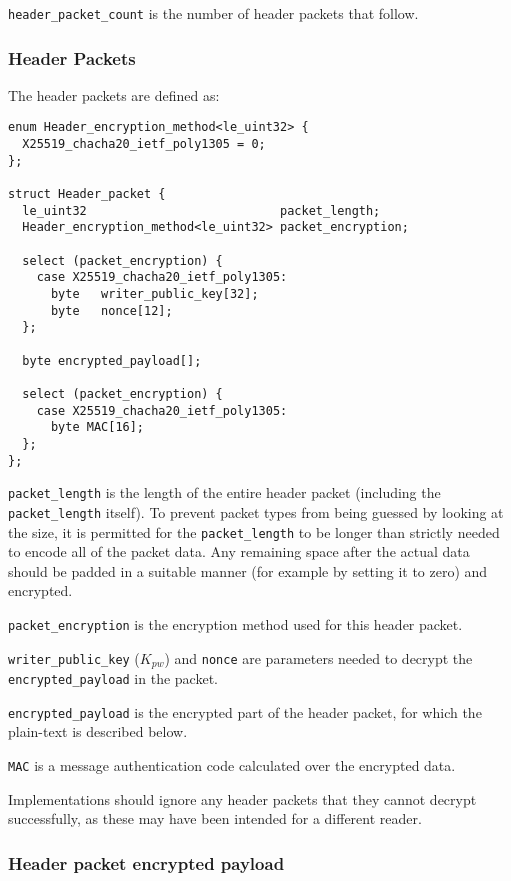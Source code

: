 \documentclass[10pt]{article}
\newcommand{\kw}[1]{\texttt{#1}}
\begin{document}
\kw{header\_packet\_count} is the number of header packets that follow.

\subsubsection{Header Packets}\label{header:encryption}

The header packets are defined as:

\begin{verbatim}
enum Header_encryption_method<le_uint32> {
  X25519_chacha20_ietf_poly1305 = 0;
};

struct Header_packet {
  le_uint32                           packet_length;
  Header_encryption_method<le_uint32> packet_encryption;

  select (packet_encryption) {
    case X25519_chacha20_ietf_poly1305:
      byte   writer_public_key[32];
      byte   nonce[12];
  };

  byte encrypted_payload[];

  select (packet_encryption) {
    case X25519_chacha20_ietf_poly1305:
      byte MAC[16];
  };
};
\end{verbatim}

\kw{packet\_length} is the length of the entire header packet (including the \kw{packet\_length} itself).
To prevent packet types from being guessed by looking at the size, it is permitted for the \kw{packet\_length} to be
longer than strictly needed to encode all of the packet data.
Any remaining space after the actual data should be padded in a suitable manner (for example by setting it to zero)
and encrypted.

\kw{packet\_encryption} is the encryption method used for this header packet.

\kw{writer\_public\_key} ($K_{pw}$) and \kw{nonce} are parameters needed to decrypt the \kw{encrypted\_payload} in the
packet.

\kw{encrypted\_payload} is the encrypted part of the header packet, for which the plain-text is described below.

\kw{MAC} is a message authentication code calculated over the encrypted data.

Implementations should ignore any header packets that they cannot decrypt successfully, as these may have
been intended for a different reader.

\subsubsection{Header packet encrypted payload}
\end{document}
